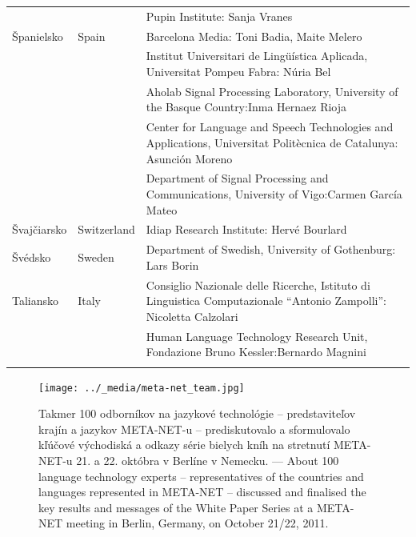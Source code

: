 \begin{longtable}{@{}llp{113mm}@{}}
  & & Pupin Institute: Sanja Vranes \\ \addlinespace  
  Španielsko & \textcolor{grey1}{Spain} & Barcelona Media: Toni Badia, Maite Melero \\ \addlinespace 
  & & Institut Universitari de Lingüística Aplicada, Universitat Pompeu Fabra: Núria Bel \\ \addlinespace 
  & & Aholab Signal Processing Laboratory, University of the Basque Country:\newline Inma Hernaez Rioja \\ \addlinespace 
  & & Center for Language and Speech Technologies and Applications, Universitat Politècnica de Catalunya:  Asunción Moreno \\ \addlinespace 
  & & Department of Signal Processing and Communications, University of Vigo:\newline Carmen García Mateo \\ \addlinespace 
  Švajčiarsko & \textcolor{grey1}{Switzerland} & Idiap Research Institute: Hervé Bourlard \\ \addlinespace 
  Švédsko & \textcolor{grey1}{Sweden} & Department of Swedish, University of Gothenburg: Lars Borin \\ \addlinespace 
  Taliansko & \textcolor{grey1}{Italy} & Consiglio Nazionale delle Ricerche, Istituto di Linguistica Computazionale “Antonio Zampolli”: Nicoletta Calzolari\\ \addlinespace
  & & Human Language Technology Research Unit, Fondazione Bruno Kessler:\newline Bernardo Magnini\\ \addlinespace 
\end{longtable}
\normalsize

\renewcommand*{\figureformat}{}
\renewcommand*{\captionformat}{}

\begin{figure}[htbp]
  \center
  \texttt{[image: ../\_media/meta-net\_team.jpg]}
  \caption{Takmer 100 odborníkov na jazykové technológie – predstaviteľov krajín a jazykov META-NET-u – prediskutovalo a sformulovalo kľúčové východiská a odkazy série bielych kníh na stretnutí META-NET-u 21. a 22. októbra v Berlíne v Nemecku. --- \textcolor{grey1}{About 100 language technology experts -- representatives of the countries and languages represented in META-NET -- discussed and finalised the key results and messages of the White Paper Series at a META-NET meeting in Berlin, Germany, on October 21/22, 2011.}}
  \medskip
\end{figure}


